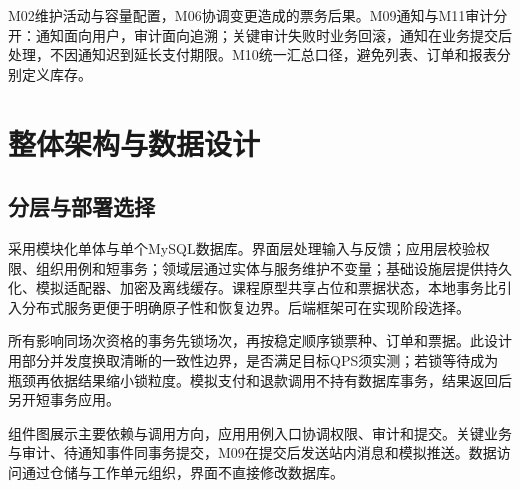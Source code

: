 \documentclass[UTF8,zihao=-4,fontset=windows]{ctexart}
\begin{document}
M02维护活动与容量配置，M06协调变更造成的票务后果。M09通知与M11审计分开：通知面向用户，审计面向追溯；关键审计失败时业务回滚，通知在业务提交后处理，不因通知迟到延长支付期限。M10统一汇总口径，避免列表、订单和报表分别定义库存。


\clearpage

\section{整体架构与数据设计}

\subsection{分层与部署选择}
采用模块化单体与单个MySQL数据库。界面层处理输入与反馈；应用层校验权限、组织用例和短事务；领域层通过实体与服务维护不变量；基础设施层提供持久化、模拟适配器、加密及离线缓存。课程原型共享占位和票据状态，本地事务比引入分布式服务更便于明确原子性和恢复边界。后端框架可在实现阶段选择。

所有影响同场次资格的事务先锁场次，再按稳定顺序锁票种、订单和票据。此设计用部分并发度换取清晰的一致性边界，是否满足目标QPS须实测；若锁等待成为瓶颈再依据结果缩小锁粒度。模拟支付和退款调用不持有数据库事务，结果返回后另开短事务应用。

组件图展示主要依赖与调用方向，应用用例入口协调权限、审计和提交。关键业务与审计、待通知事件同事务提交，M09在提交后发送站内消息和模拟推送。数据访问通过仓储与工作单元组织，界面不直接修改数据库。
\end{document}
